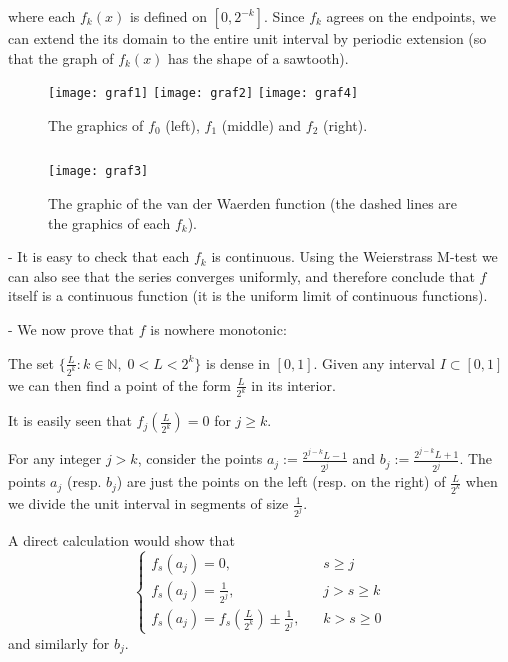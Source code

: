 \documentclass[12pt]{article}
\begin{document}
where each $f_k(x)$ is defined on $[0,2^{-k}]$.  Since $f_k$ agrees on the endpoints, we can extend the its domain to the entire unit interval by periodic extension (so that the graph of $f_k(x)$ has the shape of a sawtooth).

\begin{figure}
\begin{centering}
\texttt{[image: graf1]} \texttt{[image: graf2]} \texttt{[image: graf4]}
\caption{The graphics of $f_0$ (left), $f_1$ (middle) and $f_2$ (right).}
\end{centering}
\end{figure}

$\quad\;$

\begin{figure}
\begin{centering}
\texttt{[image: graf3]}
\caption{The graphic of the van der Waerden function (the dashed lines are the graphics of each $f_k$).}
\end{centering}
\end{figure}

 - It is easy to check that each $f_k$ is continuous. Using the Weierstrass M-test we can also see that the series converges uniformly, and therefore conclude that $f$ itself is a continuous function (it is the uniform limit of continuous functions).

 - We now prove that $f$ is nowhere monotonic: 

The set $\{\frac{L}{2^k} : k \in \mathbb{N}, \;0< L < 2^k\}$ is dense in $[0,1]$. Given any interval $I\subset [0,1]$ we can then find a point of the form $\frac{L}{2^k}$ in its interior.

It is easily seen that $f_j(\frac{L}{2^k})=0$ for $j \geq k$.

For any integer $j>k$, consider the points $a_j :=\frac{2^{j-k}L-1}{2^j}$ and $b_j := \frac{2^{j-k}L+1}{2^j}$. The points $a_j$ (resp. $b_j$) are just the points on the left (resp. on the right) of $\frac{L}{2^k}$ when we divide the unit interval in segments of size $\frac{1}{2^j}$.

A direct calculation would show that
\begin{displaymath}
\begin{cases}
f_s(a_j)=0, & s\geq j \\
f_s(a_j)=\frac{1}{2^j}, & j> s \geq k \\
f_s(a_j)= f_s(\frac{L}{2^k}) \pm \frac{1}{2^j},\;\;\; & k > s \geq 0
\end{cases}
\end{displaymath}
and similarly for $b_j$.
\end{document}
